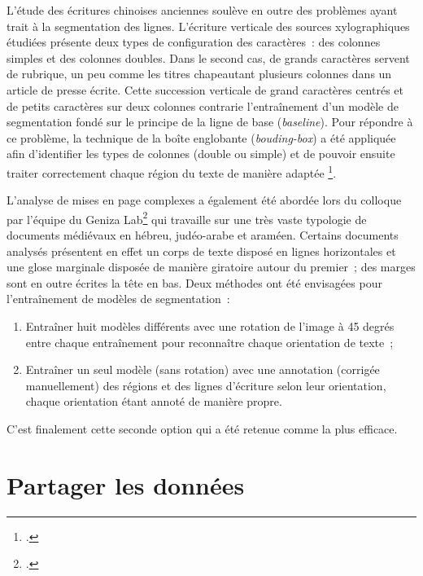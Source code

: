 \documentclass[a4paper,12pt,twoside]{book}
\begin{document}
				L'étude des écritures chinoises anciennes soulève en outre des problèmes
				ayant trait à la \gls{segmentation} des lignes. L'écriture verticale des
				sources xylographiques étudiées présente deux types de configuration des
				caractères~: des colonnes simples et des colonnes doubles. Dans le
				second cas, de grands caractères servent de rubrique, un peu comme les
				titres chapeautant plusieurs colonnes dans un article de presse écrite. Cette
				succession verticale de grand caractères centrés et de petits caractères
				sur deux colonnes contrarie l'entraînement d'un modèle de \gls{segmentation}
				fondé sur le principe de la ligne de base (\textit{baseline}).
				Pour répondre à ce problème, la technique de la boîte englobante
				(\textit{bouding-box}) a été appliquée afin d'identifier les types de
				colonnes (double ou simple) et de pouvoir ensuite traiter correctement
				chaque région du texte de manière adaptée
				\footcite{bizais-lilligExperimentationsPourAnalyse2022}.
				
				L'analyse de mises
				en page complexes a également été abordée lors du colloque par l'équipe du Geniza Lab\footcite{stoklbenezraSegmentationModeArchival2022} qui travaille sur une
				très vaste typologie de documents médiévaux en hébreu, judéo-arabe et
				araméen. Certains documents analysés présentent en effet un corps de
				texte disposé en lignes horizontales et une glose marginale disposée de
				manière giratoire autour du premier~; des marges sont en outre écrites
				la tête en bas. Deux méthodes ont été envisagées pour l'entraînement de
				modèles de \gls{segmentation}~:
				
				\begin{enumerate}
					
					\item
					Entraîner huit modèles différents avec une rotation de l'image à 45
					degrés entre chaque entraînement pour reconnaître chaque orientation
					de texte~;
					\item
					Entraîner un seul modèle (sans rotation) avec une annotation (corrigée
					manuellement) des régions et des lignes d'écriture selon leur
					orientation, chaque orientation étant annoté de manière propre.
				\end{enumerate}
				
				C'est finalement cette seconde option qui a été retenue comme la plus
				efficace.
		
		\section{Partager les données}
		
\end{document}
